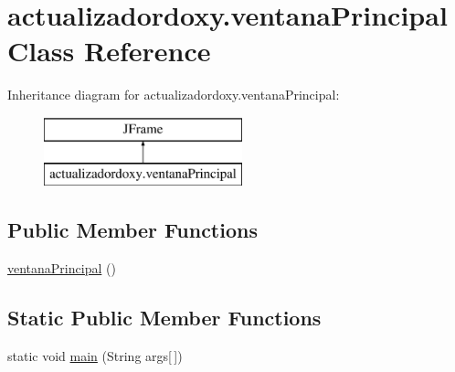 \hypertarget{classactualizadordoxy_1_1ventana_principal}{}\section{actualizadordoxy.\+ventana\+Principal Class Reference}
\label{classactualizadordoxy_1_1ventana_principal}
Inheritance diagram for actualizadordoxy.\+ventana\+Principal\+:\begin{figure}[H]
\begin{center}
\leavevmode
\includegraphics[height=2.000000cm]{classactualizadordoxy_1_1ventana_principal}
\end{center}
\end{figure}
\subsection*{Public Member Functions}
\begin{DoxyCompactItemize}
\item 
\mbox{\hyperlink{classactualizadordoxy_1_1ventana_principal_a6964b4afb82d10ecc070ac305c8e5dd4}{ventana\+Principal}} ()
\end{DoxyCompactItemize}
\subsection*{Static Public Member Functions}
\begin{DoxyCompactItemize}
\item 
static void \mbox{\hyperlink{classactualizadordoxy_1_1ventana_principal_a546323205647cde6f91ff168c86c7d0d}{main}} (String args\mbox{[}$\,$\mbox{]})
\end{DoxyCompactItemize}
